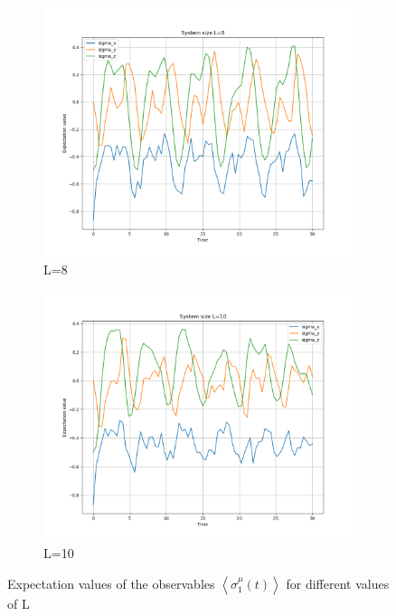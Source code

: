 \documentclass[12pt]{article}
\begin{document}
\begin{figure}[htbp]
    \centering
    \begin{subfigure}[b]{0.53\textwidth}
        \centering
        \includegraphics[width=\textwidth]{p4_1_1_expectations_L8.png}
        \caption{L=8}
        \label{fig:expectations_L8}
    \end{subfigure}
    \begin{subfigure}[b]{0.53\textwidth}
        \centering
        \includegraphics[width=\textwidth]{p4_1_1_expectations_L10.png}
        \caption{L=10}
        \label{fig:expectations_L10}
    \end{subfigure}
    \caption{Expectation values of the observables $\left\langle\sigma_{1}^{\mu}(t)\right\rangle$ for different values of L}
    \label{fig:expectations}
\end{figure}
\newpage
\end{document}
